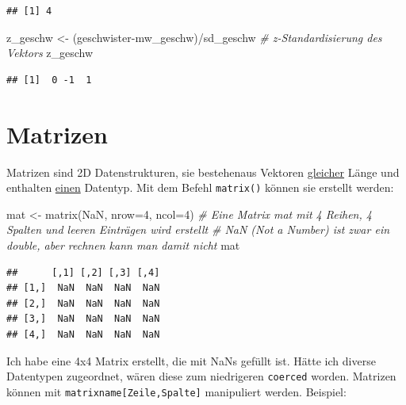\documentclass[
]{book}
\newenvironment{Shaded}{\begin{snugshade}}{\end{snugshade}}
\newcommand{\AttributeTok}[1]{\textcolor[rgb]{0.77,0.63,0.00}{#1}}
\newcommand{\CommentTok}[1]{\textcolor[rgb]{0.56,0.35,0.01}{\textit{#1}}}
\newcommand{\ConstantTok}[1]{\textcolor[rgb]{0.00,0.00,0.00}{#1}}
\newcommand{\DecValTok}[1]{\textcolor[rgb]{0.00,0.00,0.81}{#1}}
\newcommand{\FunctionTok}[1]{\textcolor[rgb]{0.00,0.00,0.00}{#1}}
\newcommand{\NormalTok}[1]{#1}
\newcommand{\OtherTok}[1]{\textcolor[rgb]{0.56,0.35,0.01}{#1}}
\newcommand{\SpecialCharTok}[1]{\textcolor[rgb]{0.00,0.00,0.00}{#1}}
\theoremstyle{definition}
\theoremstyle{definition}
\theoremstyle{definition}
\theoremstyle{definition}
\theoremstyle{remark}
\begin{document}
\begin{verbatim}
## [1] 4
\end{verbatim}

\begin{Shaded}
\begin{Highlighting}[]
\NormalTok{z\_geschw }\OtherTok{\textless{}{-}}\NormalTok{ (geschwister}\SpecialCharTok{{-}}\NormalTok{mw\_geschw)}\SpecialCharTok{/}\NormalTok{sd\_geschw  }\CommentTok{\# z{-}Standardisierung des Vektors}
\NormalTok{z\_geschw}
\end{Highlighting}
\end{Shaded}

\begin{verbatim}
## [1]  0 -1  1
\end{verbatim}

\hypertarget{matrizen}{%
\section{Matrizen}\label{matrizen}}

Matrizen sind 2D Datenstrukturen, sie bestehenaus Vektoren \underline{gleicher} Länge und enthalten \underline{einen} Datentyp. Mit dem
Befehl \texttt{matrix()} können sie erstellt werden:

\begin{Shaded}
\begin{Highlighting}[]
\NormalTok{mat }\OtherTok{\textless{}{-}} \FunctionTok{matrix}\NormalTok{(}\ConstantTok{NaN}\NormalTok{, }\AttributeTok{nrow=}\DecValTok{4}\NormalTok{, }\AttributeTok{ncol=}\DecValTok{4}\NormalTok{) }\CommentTok{\# Eine Matrix mat mit 4 Reihen, 4 Spalten und leeren Einträgen wird erstellt}
                                   \CommentTok{\# NaN (Not a Number) ist zwar ein double, aber rechnen kann man damit nicht}
\NormalTok{mat}
\end{Highlighting}
\end{Shaded}

\begin{verbatim}
##      [,1] [,2] [,3] [,4]
## [1,]  NaN  NaN  NaN  NaN
## [2,]  NaN  NaN  NaN  NaN
## [3,]  NaN  NaN  NaN  NaN
## [4,]  NaN  NaN  NaN  NaN
\end{verbatim}

Ich habe eine 4x4 Matrix erstellt, die mit NaNs gefüllt ist. Hätte ich diverse Datentypen zugeordnet, wären diese zum niedrigeren \texttt{coerced} worden. Matrizen können mit \texttt{matrixname{[}Zeile,Spalte{]}} manipuliert werden. Beispiel:
\end{document}
